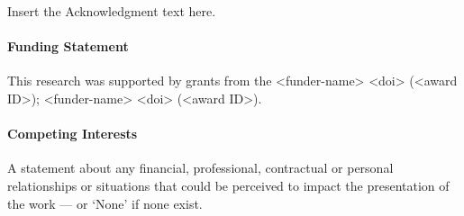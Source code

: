 \begin{acknowledgement}
    Insert the Acknowledgment text here.
    \end{acknowledgement}
    
    \paragraph{Funding Statement}
    
    This research was supported by grants from the <funder-name> <doi> (<award ID>); <funder-name> <doi> (<award ID>).
    
    \paragraph{Competing Interests}
    
    A statement about any financial, professional, contractual or personal relationships or situations that could be perceived to impact the presentation of the work --- or `None' if none exist.
    